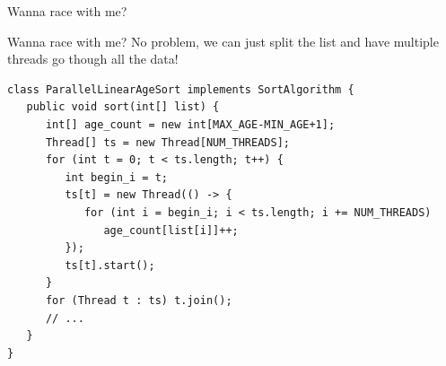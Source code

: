 \documentclass[handout]{beamer} %
\begin{document}

\begin{frame}{Wanna race with me?}
	\begin{center}
	\end{center}
\end{frame}


\begin{frame}[fragile]{Wanna race with me?}
	No problem, we can just split the list and have multiple threads
	go though all the data!
	\begin{lstlisting}
class ParallelLinearAgeSort implements SortAlgorithm {
   public void sort(int[] list) {
      int[] age_count = new int[MAX_AGE-MIN_AGE+1];
      Thread[] ts = new Thread[NUM_THREADS];
      for (int t = 0; t < ts.length; t++) {
         int begin_i = t;
         ts[t] = new Thread(() -> {
            for (int i = begin_i; i < ts.length; i += NUM_THREADS)
               age_count[list[i]]++;
         });
         ts[t].start();
      }
      for (Thread t : ts) t.join();
      // ...
   }
}
	\end{lstlisting}
\end{frame}

\end{document}
